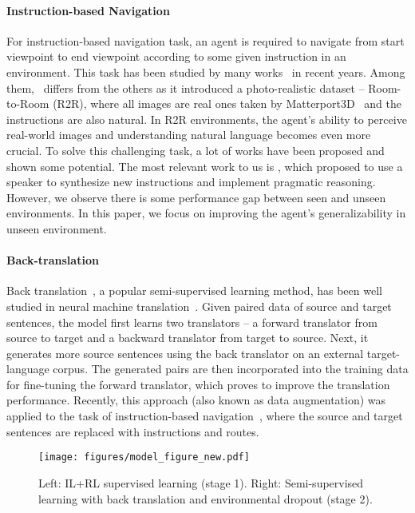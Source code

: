 \documentclass[11pt,a4paper]{article}
\begin{document}
\paragraph{Instruction-based Navigation}
For instruction-based navigation task, an agent is required to navigate from start viewpoint to end viewpoint according to some given instruction in an environment.
This task has been studied by many works~\cite{tellex2011understanding,chen2011learning,artzi2013weakly,andreas2015alignment,mei2016listen,misra2017mapping} in recent years.
Among them,~\cite{mattersim} differs from the others as it introduced a photo-realistic dataset -- Room-to-Room (R2R), where all images are real ones taken by Matterport3D~\cite{Matterport3D} and the instructions are also natural.
In R2R environments, the agent's ability to perceive real-world images and understanding natural language becomes even more crucial.
To solve this challenging task, a lot of works
\cite{fried2018speaker, wang2018look,wang2018reinforced, anonymous2019self-aware} 
have been proposed and shown some potential. 
The most relevant work to us is , which proposed to use a speaker to synthesize new instructions and implement pragmatic reasoning.
However, we observe there is some performance gap between seen and unseen environments.
In this paper, we focus on improving the agent's generalizability in unseen environment.


\paragraph{Back-translation}
Back translation~\cite{sennrich2016improving}, a popular semi-supervised learning method, has been well studied in neural machine translation~\cite{hoang2018iterative, wang2018switchout, edunov2018understanding, style_transfer_acl18}.
Given paired data of source and target sentences, the model first learns two translators -- a forward translator from source to target and a backward translator from target to source.
Next, it generates more source sentences using the back translator on an external target-language corpus.
The generated pairs are then incorporated into the training data for fine-tuning the forward translator, which proves to improve the translation performance.
Recently, this approach (also known as data augmentation) was applied to the task of instruction-based navigation~\cite{fried2018speaker}, where the source and target sentences are replaced with instructions and routes.
 \begin{figure*}[t]
\centering
\texttt{[image: figures/model\_figure\_new.pdf]}
\vspace{4pt}
\caption{Left: IL+RL supervised learning (stage 1). Right: Semi-supervised learning with back translation and environmental dropout (stage 2). 
}
\vspace{-10pt}
\label{fig:ssl}
\end{figure*}
\end{document}

